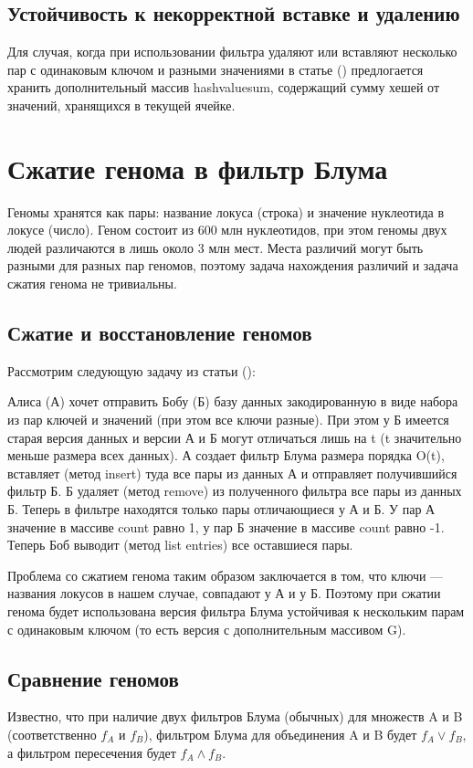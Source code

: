 \documentclass{article}
\begin{document}
\subsection{Устойчивость к некорректной вставке и удалению}

Для случая, когда при использовании фильтра удаляют или вставляют несколько пар с одинаковым ключом и разными значениями в статье (\textcite{GoMi2011}) предлогается хранить дополнительный массив hashvaluesum, содержащий сумму хешей от значений, хранящихся в текущей ячейке.

\section{Сжатие генома в фильтр Блума}

Геномы хранятся как пары: название локуса (строка) и значение нуклеотида в локусе (число).
Геном состоит из 600 млн нуклеотидов, при этом геномы двух людей различаются в лишь около 3 млн мест.
Места различий могут быть разными для разных пар геномов, поэтому задача нахождения различий и задача сжатия генома не тривиальны.

\subsection{Сжатие и восстановление геномов}
Рассмотрим следующую задачу из статьи (\textcite{GoMi2011}):

Алиса (А) хочет отправить Бобу (Б) базу данных закодированную в виде набора из пар ключей и значений (при этом все ключи разные).
При этом у Б имеется старая версия данных и версии А и Б могут отличаться лишь на t (t значительно меньше размера всех данных).
А создает фильтр Блума размера порядка O(t), вставляет (метод insert) туда все пары из данных А и отправляет получившийся фильтр Б.
Б удаляет (метод remove) из полученного фильтра все пары из данных Б.
Теперь в фильтре находятся только пары отличающиеся у А и Б. У пар А значение в массиве count равно 1, у пар Б значение в массиве count равно -1.
Теперь Боб выводит (метод list entries) все оставшиеся пары.

Проблема со сжатием генома таким образом заключается в том, что ключи --- названия локусов в нашем случае, совпадают у А и у Б.
Поэтому при сжатии генома будет использована версия фильтра Блума устойчивая к нескольким парам с одинаковым ключом (то есть версия с дополнительным массивом G).


\subsection{Сравнение геномов} 
Известно, что при наличие двух фильтров Блума (обычных) для множеств A и B (соответственно $f_A$ и $f_B$), 
фильтром Блума для объединения A и B будет $f_A \vee f_B$, а фильтром пересечения будет $f_A \wedge f_B$.
\end{document}
